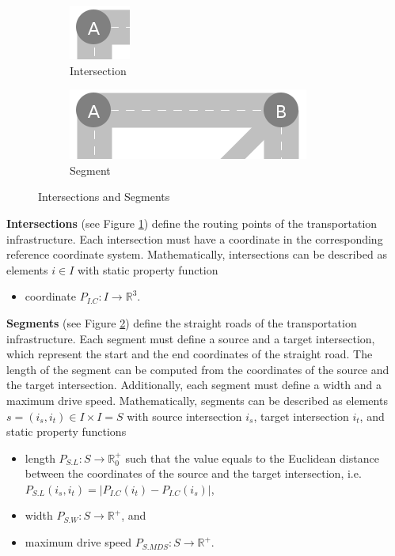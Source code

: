 \documentclass[graybox]{svmult}
\begin{document}
\begin{figure}
	\begin{subfigure}{.5\textwidth}
		\centering
		\includegraphics[scale=0.4]{../../concepts/intersection.png}
		\caption{Intersection}
		\label{fig:intersection}
	\end{subfigure}
	\hfill
	\begin{subfigure}{.5\textwidth}
		\centering
		\includegraphics[scale=0.4]{../../concepts/segment.png}
		\caption{Segment}
		\label{fig:segment}
	\end{subfigure}
	\hfill
	\caption{Intersections and Segments}
	\label{fig:intersections-segments}	
\end{figure}
\vspace{4mm}

\noindent
\textbf{Intersections} (see Figure \ref{fig:intersection})
define the routing points of the transportation infrastructure.
Each intersection must have a coordinate in the corresponding reference coordinate system.
Mathematically, intersections can be described as elements $i \in I$ with static property function
\begin{itemize}
	\item coordinate $P_{I.C}: I \rightarrow \mathbb{R}^3$.
\end{itemize}
\vspace{2mm}

\noindent
\textbf{Segments} (see Figure \ref{fig:segment})
define the straight roads of the transportation infrastructure.
Each segment must define a source and a target intersection, which represent the start and the end coordinates of the straight road.
The length of the segment can be computed from the coordinates of the source and the target intersection.
Additionally, each segment must define a width and a maximum drive speed.
Mathematically, segments can be described as elements $s = (i_s, i_t) \in I \times I = S$ with source intersection $i_s$, target intersection $i_t$, and static property functions
\begin{itemize}
	\item length $P_{S.L}: S \rightarrow \mathbb{R}_0^+$ such that the value equals to the Euclidean distance between the coordinates of the source and the target intersection, i.e.\ $P_{S.L}(i_s, i_t) = |P_{I.C}(i_t) - P_{I.C}(i_s)|$,
	\item width $P_{S.W}: S \rightarrow \mathbb{R}^+$, and
	\item maximum drive speed $P_{S.MDS}: S \rightarrow \mathbb{R}^+$.
\end{itemize}
\vspace{-2mm}
\end{document}
